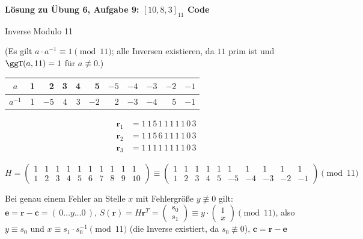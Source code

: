 \textbf{Lösung zu Übung 6, Aufgabe 9: $[10, 8, 3]_{11}$ Code}

\begin{loesung}
Inverse Modulo 11
\begin{center}
(Es gilt $a \cdot a^{-1} \equiv 1 \pmod{11}$; alle Inversen existieren, da $11$ prim ist und $\ggT(a, 11) = 1$ für $a \not\equiv 0$.)
\begin{tabular}{c|rrrrrrrrrr}
$a$      & 1 & 2  & 3 & 4 & 5  & $-5$ & $-4$ & $-3$ & $-2$ & $-1$\\
\midrule
$a^{-1}$ & 1 & $-5$ & 4 & 3 & $-2$ & 2 & $-3$ & $-4$ & 5 & $-1$\\
\end{tabular}
\end{center}

\begin{align*}
\mathbf{r}_1 &= 1\,1\,5\,1\,1\,1\,1\,1\,0\,3\\
\mathbf{r}_2 &= 1\,1\,5\,6\,1\,1\,1\,1\,0\,3\\
\mathbf{r}_3 &= 1\,1\,1\,1\,1\,1\,1\,1\,0\,3
\end{align*}

\[
H = \begin{pmatrix}
1 & 1 & 1 & 1 & 1 & 1 & 1 & 1 & 1 & 1\\
1 & 2 & 3 & 4 & 5 & 6 & 7 & 8 & 9 & 10
\end{pmatrix}
\equiv
\begin{pmatrix}
1 & 1 & 1 & 1 & 1 & 1 & 1 & 1 & 1 & 1\\
1 & 2 & 3 & 4 & 5 & -5 & -4 & -3 & -2 & -1
\end{pmatrix}
\pmod{11}
\]

Bei genau einem Fehler an Stelle $x$ mit Fehlergröße $y \not\equiv 0$ gilt:
$\mathbf{e} = \mathbf{r} - \mathbf{c} = (\,0 \dots y \dots 0\,)$, \quad
$S(\mathbf{r}) = H\mathbf{r}^T = \begin{pmatrix} s_0\\ s_1 \end{pmatrix} \equiv y \cdot \begin{pmatrix} 1\\ x \end{pmatrix} \pmod{11}$, \quad
also $y \equiv s_0$ und $x \equiv s_1 \cdot s_0^{-1} \pmod{11}$ (die Inverse existiert, da $s_0 \not\equiv 0$), \quad
$\mathbf{c} = \mathbf{r} - \mathbf{e}$


\end{loesung}
